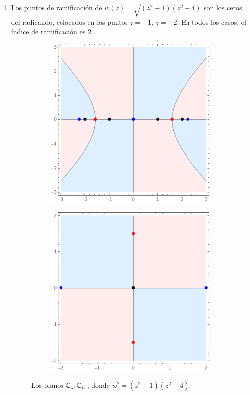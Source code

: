 \begin{solution}
\begin{itemize}
\begin{enumerate}[label=\alph*)]
        \item Los puntos de ramificación de $w(z) = \sqrt {(z^2 - 1) (z^2 - 4)}$ son los ceros del radicando, colocados en  los puntos $z = \pm 1$, $z = \pm 2$. En todos los casos, el índice de ramificación es $2$.
        \begin{figure}[h]
            \centering
            \begin{subfigure}{.4\textwidth}
                \centering
                \includegraphics[scale=0.4]{ramification/2-z.png}
            \end{subfigure}
            \begin{subfigure}{.4\textwidth}
                \centering
                \includegraphics[scale=0.4]{ramification/2-w.png}
            \end{subfigure}
            \caption{Los planos $\mathbb C_z, \mathbb C_w$, donde $w^2 = (z^2 - 1) (z^2 - 4)$.}
        \end{figure}
        

\end{enumerate}
\end{itemize}
\end{solution}
